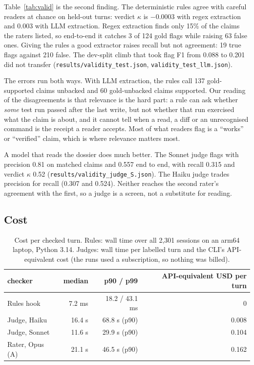 \documentclass[11pt]{article}
\begin{document}
Table~\ref{tab:valid} is the second finding. The deterministic rules agree with careful readers at chance on
held-out turns: verdict $\kappa$ is $-0.0003$ with regex extraction and $0.003$ with LLM extraction. Regex
extraction finds only 15\% of the claims the raters listed, so end-to-end it catches 3 of 124 gold flags while
raising 63 false ones. Giving the rules a good extractor raises recall but not agreement: 19 true flags against
210 false. The dev-split climb that took flag F1 from 0.088 to 0.201 did not transfer
(\texttt{results/validity\_test.json}, \texttt{validity\_test\_llm.json}).

The errors run both ways. With LLM extraction, the rules call 137 gold-supported claims unbacked and 60
gold-unbacked claims supported. Our reading of the disagreements is that relevance is the hard part: a rule can
ask whether \emph{some} test run passed after the last write, but not whether that run exercised what the claim
is about, and it cannot tell when a read, a diff or an unrecognised command is the receipt a reader accepts.
Most of what readers flag is a ``works'' or ``verified'' claim, which is where relevance matters most.

A model that reads the dossier does much better. The Sonnet judge flags with precision 0.81 on matched claims and
0.557 end to end, with recall 0.315 and verdict $\kappa$ 0.52 (\texttt{results/validity\_judge\_S.json}). The Haiku
judge trades precision for recall (0.307 and 0.524). Neither reaches the second rater's agreement with the first,
so a judge is a screen, not a substitute for reading.

\subsection{Cost}

\begin{table}[h]
\centering
\caption{Cost per checked turn. Rules: wall time over all 2,301 sessions on an arm64 laptop, Python 3.14. Judges: wall time per labelled turn and the CLI's API-equivalent cost (the runs used a subscription, so nothing was billed).}
\label{tab:cost}
\begin{tabular}{lrrr}
\toprule
checker & median & p90 / p99 & API-equivalent USD per turn \\
\midrule
Rules hook & 7.2 ms & 18.2 / 43.1 ms & 0 \\
Judge, Haiku & 16.4 s & 68.8 s (p90) & 0.008 \\
Judge, Sonnet & 11.6 s & 29.9 s (p90) & 0.104 \\
Rater, Opus (A) & 21.1 s & 46.5 s (p90) & 0.162 \\
\bottomrule
\end{tabular}
\end{table}
\end{document}
